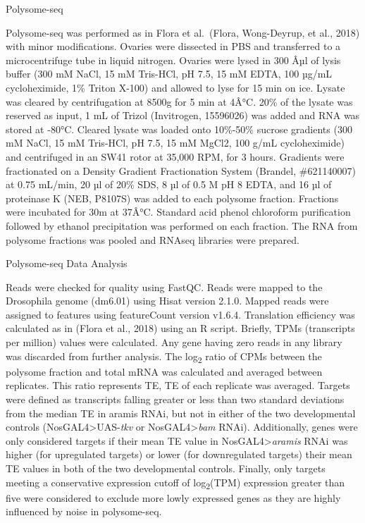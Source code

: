 \documentclass[12pt,twoside]{reedthesis}
\begin{document}
{Polysome-seq}

Polysome-seq was performed as in Flora et al.~(Flora, Wong-Deyrup, et al., 2018) with
minor modifications. Ovaries were dissected in PBS and transferred to a
microcentrifuge tube in liquid nitrogen. Ovaries were lysed in 300 Âµl of
lysis buffer (300 mM NaCl, 15 mM Tris-HCl, pH 7.5, 15 mM EDTA, 100 µg/mL
cycloheximide, 1\% Triton X-100) and allowed to lyse for 15 min on ice.
Lysate was cleared by centrifugation at 8500g for 5 min at 4Â°C. 20\% of
the lysate was reserved as input, 1 mL of Trizol (Invitrogen, 15596026)
was added and RNA was stored at -80°C. Cleared lysate was loaded onto
10\%-50\% sucrose gradients (300 mM NaCl, 15 mM Tris-HCl, pH 7.5, 15 mM
MgCl2, 100 g/mL cycloheximide) and centrifuged in an SW41 rotor at
35,000 RPM, for 3 hours. Gradients were fractionated on a Density
Gradient Fractionation System (Brandel, \#621140007) at 0.75 mL/min, 20
µl of 20\% SDS, 8 µl of 0.5 M pH 8 EDTA, and 16 µl of proteinase K (NEB,
P8107S) was added to each polysome fraction. Fractions were incubated
for 30m at 37Â°C. Standard acid phenol chloroform purification followed
by ethanol precipitation was performed on each fraction. The RNA from
polysome fractions was pooled and RNAseq libraries were prepared.

{Polysome-seq Data Analysis}

Reads were checked for quality using FastQC. Reads were mapped to the
Drosophila genome (dm6.01) using Hisat version 2.1.0. Mapped reads were
assigned to features using featureCount version v1.6.4. Translation
efficiency was calculated as in (Flora et al., 2018) using an R script.
Briefly, TPMs (transcripts per million) values were calculated. Any gene
having zero reads in any library was discarded from further analysis.
The log\textsubscript{2} ratio of CPMs between the polysome fraction and total mRNA
was calculated and averaged between replicates. This ratio represents
TE, TE of each replicate was averaged. Targets were defined as
transcripts falling greater or less than two standard deviations from
the median TE in aramis RNAi, but not in either of the two developmental
controls (NosGAL4\textgreater UAS-\emph{tkv} or NosGAL4\textgreater{}\emph{bam} RNAi). Additionally,
genes were only considered targets if their mean TE value in
NosGAL4\textgreater{}\emph{aramis} RNAi was higher (for upregulated targets) or lower
(for downregulated targets) their mean TE values in both of the two
developmental controls. Finally, only targets meeting a conservative
expression cutoff of log\textsubscript{2}(TPM) expression greater than five were
considered to exclude more lowly expressed genes as they are highly
influenced by noise in polysome-seq.
\end{document}
